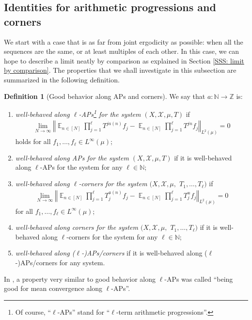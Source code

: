 \documentclass[11pt]{amsart}
\theoremstyle{definition}
\newtheorem{definition}[lemma]{Definition}
\DeclareMathOperator*{\E}{\mathbb{E}}
\newcommand{\N}{{\mathbb N}}
\newcommand{\Z}{{\mathbb Z}}
\newcommand{\CX}{{\mathcal X}}
\newcommand{\norm}[1]{\left\Vert #1\right\Vert}
\newcommand{\1}{{\mathbf{1}}}
\begin{document}
\subsection{Identities for arithmetic progressions and corners}
We start with a case that is as far from joint ergodicity as possible: when all the sequences are the same, or at least multiples of each other. In this case, we can hope to describe a limit neatly by comparison as explained in Section \ref{SSS: limit by comparison}. The properties that we shall investigate in this subsection are summarized in the following definition.
\begin{definition}[Good behavior along APs and corners]
    We say that $a:\N\to\Z$ is:
    \begin{enumerate}
        \item \emph{well-behaved along $\ell$-APs\footnote{Of course, ``$\ell$-APs'' stand for ``$\ell$-term arithmetic progressions''.} for the system $(X, \CX, \mu, T)$} if 
        \begin{align}\label{E: identity along APs}
        \lim_{N\to\infty}\norm{\E_{n\in[N]}\prod_{j=1}^\ell T^{j a(n)}f_j - \E_{n\in[N]}\prod_{j=1}^\ell T^{jn}f_j}_{L^2(\mu)} = 0
    \end{align}
    holds for all $f_1, \ldots, f_\ell\in L^\infty(\mu)$;
    \item \emph{well-behaved along APs for the system $(X, \CX, \mu, T)$} if it is well-behaved along $\ell$-APs for the system for any $\ell\in\N$;
    \item \emph{well-behaved along $\ell$-corners for the system $(X, \CX, \mu,$\! $T_1, \ldots, T_\ell)$} if 
        \begin{align}\label{E: identity along corners}
        \lim_{N\to\infty}\norm{\E_{n\in[N]}\prod_{j=1}^\ell T_j^{a(n)}f_j - \E_{n\in[N]}\prod_{j=1}^\ell T_j^nf_j}_{L^2(\mu)} = 0
    \end{align}
    for all $f_1, \ldots, f_\ell\in L^\infty(\mu)$;
    \item \emph{well-behaved along corners for the system $(X, \CX, \mu,$\! $T_1, \ldots, T_\ell)$} if it is well-behaved along $\ell$-corners for the system for any $\ell\in\N$;
    \item \emph{well-behaved along ($\ell$-)APs/corners} if it is well-behaved along ($\ell$-)APs/corners for any system.
    \end{enumerate}
\end{definition}
In \cite{FrKu22c}, a property very similar to good behavior along $\ell$-APs was called ``being good for mean convergence along $\ell$-APs''.  
\end{document}

